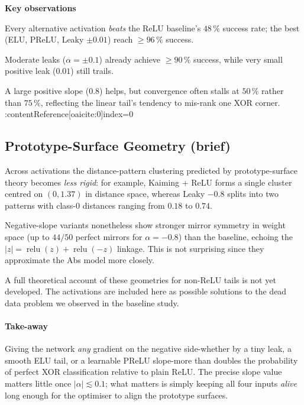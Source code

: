 \textbf{Key observations}
\begin{enumerate*}[label=(\alph*)]
  \item Every alternative activation \emph{beats} the ReLU
        baseline's $48\,\%$ success rate;
        the best (ELU, PReLU, Leaky $\pm0.01$) reach $\ge96\,\%$
        success.%
        
  \item Moderate leaks ($\alpha=\pm0.1$) already achieve $\ge90\,\%$
        success, while very small positive leak ($0.01$) still trails.%
        
  \item A large positive slope ($0.8$) helps, but convergence often
        stalls at $50\,\%$ rather than $75\,\%$, reflecting the linear
        tail's tendency to mis-rank one XOR corner.%
        :contentReference[oaicite:0]{index=0}
\end{enumerate*}

\subsection*{Prototype-Surface Geometry (brief)}
Across activations the distance-pattern clustering predicted by
prototype-surface theory becomes \emph{less rigid}:  
for example, Kaiming + ReLU forms a single cluster centred on
$(0,1.37)$ in distance space, whereas Leaky $-0.8$ splits into two
patterns with class-$0$ distances ranging from $0.18$ to $0.74$.%

Negative-slope variants nonetheless show stronger mirror symmetry in
weight space (up to $44/50$ perfect mirrors for $\alpha=-0.8$) than the
baseline, echoing the
$|z|=\operatorname{relu}(z)+\operatorname{relu}(-z)$ linkage. 
This is not surprising since they approximate the Abs model more closely.

A full theoretical account of these geometries for non-ReLU tails is not
yet developed. The activations are included here as possible solutions to 
the dead data problem we observed in the baseline study.

\paragraph{Take-away}
Giving the network \emph{any} gradient on the negative side-whether by a
tiny leak, a smooth ELU tail, or a learnable PReLU slope-more than
doubles the probability of perfect XOR classification relative to plain
ReLU.  The precise slope value matters little once \(|\alpha|\lesssim0.1\);
what matters is simply keeping all four inputs \emph{alive} long enough
for the optimiser to align the prototype surfaces.

\hrulefill
